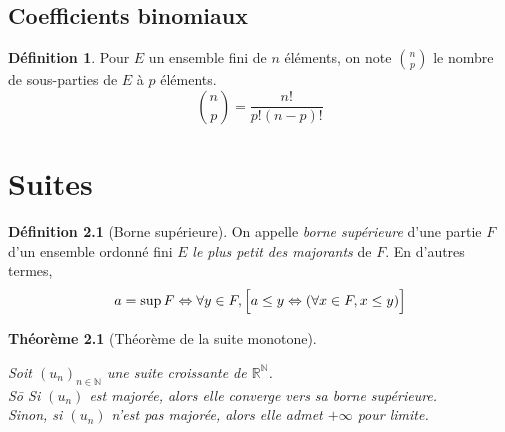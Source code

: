 \documentclass[11pt,a4paper]{report}
\newtheorem{itheorem}[theorem]{Théorème}
\theoremstyle{definition}
\newtheorem{dfn}[theorem]{Définition}
\begin{document}
\section{Coefficients binomiaux} %
\label{sec:coefficients_binomiaux}
\begin{dfn}
     Pour $E$ un ensemble fini de $n$ éléments, on note $\binom{n}{p}$ le nombre de sous-parties de $E$ à $p$ éléments.
     \begin{equation}
     \binom{n}{p} = \dfrac{n!}{p!(n-p)!}
     \end{equation}
\end{dfn}


\chapter{Suites}
\begin{dfn}[Borne supérieure]
     On appelle \emph{borne supérieure} d'une partie $F$ d'un ensemble ordonné fini $E$ \emph{le plus petit des majorants} de $F$.\newline
     En d'autres termes,
     \begin{equation}
      a = \sup F \Leftrightarrow \forall y \in F, \left[ \vphantom{\sum{}} a \le y \Leftrightarrow \left( \forall x \in F, x \le y \right) \right]
     \end{equation} 
\end{dfn}
\begin{itheorem}[Théorème de la suite monotone]
    \begin{tabbing}
     Soit $\left( u_n\right)_{n\in \mathbb{N}}$ une suite croissante de $\ensuremath{\mathbb{R}}^\mathbb{N}$. \\
     So\= \kill
     \> Si $(u_n)$ est majorée, alors elle converge \emph{vers sa borne supérieure}.\\
     \> Sinon, si $(u_n)$ n'est pas majorée, alors elle admet $+\infty$ pour limite.
     \end{tabbing}
\end{itheorem}
\end{document}
